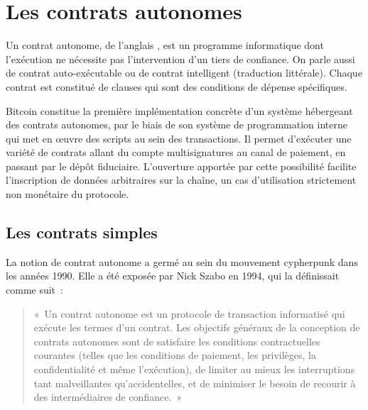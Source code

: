 
\chapter{Les contrats autonomes}
\label{ch:13}

Un contrat autonome, de l'anglais , est un programme informatique dont l'exécution ne nécessite pas l'intervention d'un tiers de confiance. On parle aussi de contrat auto-exécutable ou de contrat intelligent (traduction littérale). Chaque contrat est constitué de clauses qui sont des conditions de dépense spécifiques.

Bitcoin constitue la première implémentation concrète d'un système hébergeant des contrats autonomes, par le biais de son système de programmation interne qui met en œuvre des scripts au sein des transactions. Il permet d'exécuter une variété de contrats allant du compte multisignatures au canal de paiement, en passant par le dépôt fiduciaire. L'ouverture apportée par cette possibilité facilite l'inscription de données arbitraires sur la chaîne, un cas d'utilisation strictement non monétaire du protocole.

\section*{Les contrats simples}

La notion de contrat autonome a germé au sein du mouvement cypherpunk dans les années 1990. Elle a été exposée par Nick Szabo en 1994, qui la définissait comme suit~:

\begin{quote}
«~Un contrat autonome est un protocole de transaction informatisé qui exécute les termes d'un contrat. Les objectifs généraux de la conception de contrats autonomes sont de satisfaire les conditions contractuelles courantes (telles que les conditions de paiement, les privilèges, la confidentialité et même l'exécution), de limiter au mieux les interruptions tant malveillantes qu'accidentelles, et de minimiser le besoin de recourir à des intermédiaires de confiance.~»
\end{quote} %

